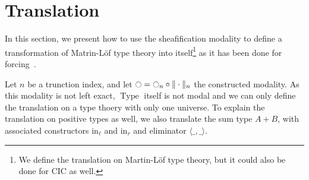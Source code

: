 \documentclass[preprint,9pt,numbers]{sigplanconf}
\DeclareMathOperator{\Type}{Type}
\newcommand{\modal}{\ensuremath{\ocircle}}
\begin{document}
\section{Translation}
\label{sec:translation}

In this section, we present how to use the sheafification modality to
define a transformation of Matrin-Löf type theory into
itself\footnote{We define the translation on Martin-Löf type theory,
  but it could also be done for CIC as well.} as it has been done for
forcing~\cite{jaber2012extending}.

Let $n$ be a trunction index, and let $\modal = \modal_n \circ
\|\cdot\|_n$ the constructed modality. 
%
As this modality is not left exact, $\Type$ itself is not modal and we
can only define the translation on a type thoery with only one
universe.
%
To explain the translation on positive types as well, we also
translate the sum type $A+B$, with associated constructors
$\mathrm{in}_\ell$
and $\mathrm{in}_r$ and eliminator $\langle \_ , \_ \rangle$.
%
%
\end{document}
